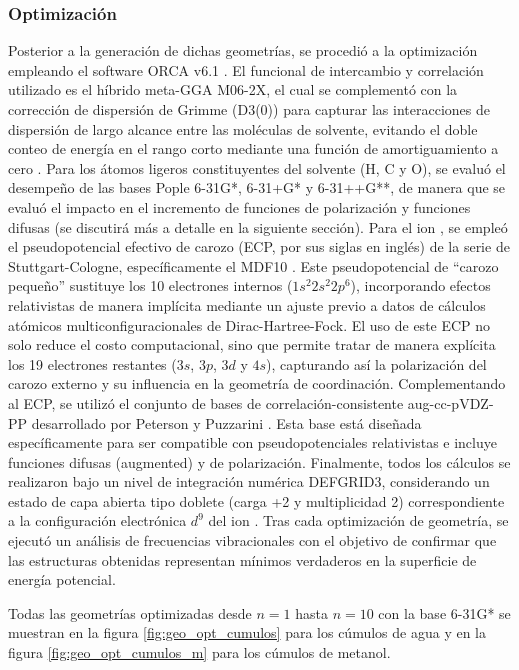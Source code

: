\subsubsection*{Optimización}
Posterior a la generación de dichas geometrías, se procedió a la optimización empleando el software ORCA v6.1 \cite{orca,orca6.1}. El funcional de intercambio y correlación utilizado es el híbrido meta-GGA M06-2X, el cual se complementó con la corrección de dispersión de Grimme (D3(0)) para capturar las interacciones de dispersión de largo alcance entre las moléculas de solvente, evitando el doble conteo de energía en el rango corto mediante una función de amortiguamiento a cero \cite{grimme2010consistent}. Para los átomos ligeros constituyentes del solvente (H, C y O), se evaluó el desempeño de las bases Pople 6-31G*, 6-31+G* y 6-31++G**, de manera que se evaluó el impacto en el incremento de funciones de polarización y funciones difusas (se discutirá más a detalle en la siguiente sección). Para el ion , se empleó el pseudopotencial efectivo de carozo (ECP, por sus siglas en inglés) de la serie de Stuttgart-Cologne, específicamente el MDF10 \cite{figgen2005energy}. Este pseudopotencial de ``carozo pequeño'' sustituye los 10 electrones internos ($1s^2 2s^2 2p^6$), incorporando efectos relativistas de manera implícita mediante un ajuste previo a datos de cálculos atómicos multiconfiguracionales de Dirac-Hartree-Fock. El uso de este ECP no solo reduce el costo computacional, sino que permite tratar de manera explícita los 19 electrones restantes ($3s$, $3p$, $3d$ y $4s$), capturando así la polarización del carozo externo y su influencia en la geometría de coordinación. Complementando al ECP, se utilizó el conjunto de bases de correlación-consistente aug-cc-pVDZ-PP desarrollado por Peterson y Puzzarini \cite{peterson2005systematically}. Esta base está diseñada específicamente para ser compatible con pseudopotenciales relativistas e incluye funciones difusas (augmented) y de polarización.
Finalmente, todos los cálculos se realizaron bajo un nivel de integración numérica DEFGRID3, considerando un estado de capa abierta tipo doblete (carga +2 y multiplicidad 2) correspondiente a la configuración electrónica $d^9$ del ion . Tras cada optimización de geometría, se ejecutó un análisis de frecuencias vibracionales con el objetivo de confirmar que las estructuras obtenidas representan mínimos verdaderos en la superficie de energía potencial.

Todas las geometrías optimizadas desde $n = 1$ hasta $n = 10$ con la base 6-31G* se muestran en la figura \ref{fig:geo_opt_cumulos} para los cúmulos de agua y en la figura \ref{fig:geo_opt_cumulos_m} para los cúmulos de metanol.

